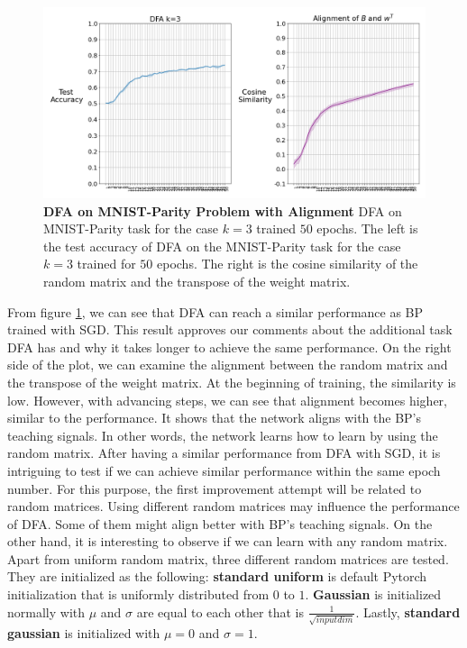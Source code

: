 \documentclass[a4paper, nobind]{templates/ociamthesis}
\begin{document}
\begin{figure}

{\centering \includegraphics[width=1\linewidth]{figures/3_k3_SGD_DFA_Alingment} 

}

\caption[DFA on MNIST-Parity Problem with Alignment]{\textbf{DFA on MNIST-Parity Problem with Alignment} \newline DFA on MNIST-Parity task for the case $k=3$ trained $50$ epochs. The left is the test accuracy of DFA on the MNIST-Parity task for the case $k=3$ trained for $50$ epochs. The right is the cosine similarity of the random matrix and the transpose of the weight matrix.}\label{fig:DFA50epochs}
\end{figure}

\noindent From figure \ref{fig:DFA50epochs}, we can see that DFA can reach a similar performance as BP trained with SGD. This result approves our comments about the additional task DFA has and why it takes longer to achieve the same performance. On the right side of the plot, we can examine the alignment between the random matrix and the transpose of the weight matrix. At the beginning of training, the similarity is low. However, with advancing steps, we can see that alignment becomes higher, similar to the performance. It shows that the network aligns with the BP's teaching signals. In other words, the network learns how to learn by using the random matrix.
\noindent After having a similar performance from DFA with SGD, it is intriguing to test if we can achieve similar performance within the same epoch number. For this purpose, the first improvement attempt will be related to random matrices. Using different random matrices may influence the performance of DFA. Some of them might align better with BP's teaching signals. On the other hand, it is interesting to observe if we can learn with any random matrix.\\
Apart from uniform random matrix, three different random matrices are tested. They are initialized as the following: \textbf{standard uniform} is default Pytorch initialization that is uniformly distributed from \(0\) to \(1\). \textbf{Gaussian} is initialized normally with \(\mu\) and \(\sigma\) are equal to each other that is \(\frac{1}{\sqrt{input dim}}\). Lastly, \textbf{standard gaussian} is initialized with \(\mu=0\) and \(\sigma=1\).
\end{document}
